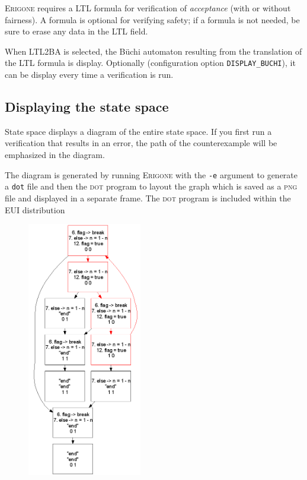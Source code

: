 \documentclass[11pt]{article}
\newcommand{\eri}{\textsc{Erigone}}
\newcommand{\eui}{\textsc{EUI}}
\newcommand{\p}[1]{\texttt{#1}}
\newcommand{\bu}[1]{\textsf{#1}}
\begin{document}
\eri{} requires a LTL formula for verification of \emph{acceptance}
(with or without fairness). A formula is optional for verifying safety;
if a formula is not needed, be sure to erase any data in the LTL field.

When \bu{LTL2BA} is selected, the B\"{u}chi automaton resulting from the
translation of the LTL formula is display. Optionally (configuration
option \p{DISPLAY\_BUCHI}), it can be display every time a verification
is run.

\subsection{Displaying the state space}\label{s.space}

\bu{State space} displays a diagram of the entire state space. If you
first run a verification that results in an error, the path of the
counterexample will be emphasized in the diagram.

The diagram is generated by running \eri{} with the \p{-e} argument to
generate a \texttt{dot} file and then the \textsc{dot} program to layout
the graph which is saved as a \textsc{png} file and displayed in a
separate frame. The \textsc{dot} program is included within the \eui{}
distribution

\begin{figure}[hbt]
\begin{center}
\includegraphics[width=50mm,keepaspectratio=true]{fair}
\end{center}
\end{figure}
\end{document}

